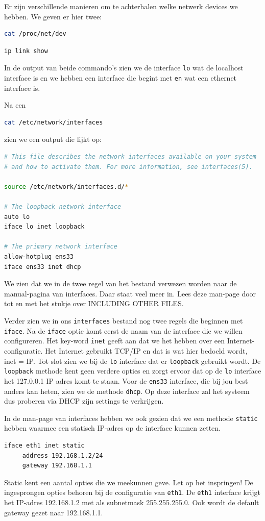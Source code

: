 Er zijn verschillende manieren om te achterhalen welke netwerk devices we hebben. We geven er hier twee:
\begin{lstlisting}[language=bash]
cat /proc/net/dev
\end{lstlisting}

\begin{lstlisting}[language=bash]
ip link show
\end{lstlisting}

In de output van beide commando's zien we de interface \texttt{lo} wat de localhost interface is en we hebben een interface die begint met \texttt{en} wat een ethernet interface is.

Na een
\begin{lstlisting}[language=bash]
cat /etc/network/interfaces
\end{lstlisting}
zien we een output die lijkt op:
\begin{lstlisting}[language=bash]
# This file describes the network interfaces available on your system
# and how to activate them. For more information, see interfaces(5).

source /etc/network/interfaces.d/*

# The loopback network interface
auto lo
iface lo inet loopback

# The primary network interface
allow-hotplug ens33
iface ens33 inet dhcp
\end{lstlisting}
We zien dat we in de twee regel van het bestand verwezen worden naar de manual-pagina van interfaces. Daar staat veel meer in. Lees deze man-page door tot en met het stukje over INCLUDING OTHER FILES.

Verder zien we in ons \texttt{interfaces} bestand nog twee regels die beginnen met \texttt{iface}. Na de \texttt{iface} optie komt eerst de naam van de interface die we willen configureren. Het key-word \texttt{inet} geeft aan dat we het hebben over een Internet-configuratie. Het Internet gebruikt TCP/IP en dat is wat hier bedoeld wordt, inet = IP. Tot slot zien we bij de \texttt{lo} interface dat er \texttt{loopback} gebruikt wordt. De \texttt{loopback} methode kent geen verdere opties en zorgt ervoor dat op de \texttt{lo} interface het 127.0.0.1 IP adres komt te staan. Voor de \texttt{ens33} interface, die bij jou best anders kan heten, zien we de methode \texttt{dhcp}. Op deze interface zal het systeem dus proberen via DHCP zijn settings te verkrijgen.

In de man-page van interfaces hebben we ook gezien dat we een methode \texttt{static} hebben waarmee een statisch IP-adres op de interface kunnen zetten.
\begin{lstlisting}[language=bash]
iface eth1 inet static
     address 192.168.1.2/24
     gateway 192.168.1.1
\end{lstlisting}
Static kent een aantal opties die we meekunnen geve. Let op het inspringen! De ingesprongen opties behoren bij de configuratie van \texttt{eth1}. De \texttt{eth1} interface krijgt het IP-adres 192.168.1.2 met als subnetmask 255.255.255.0. Ook wordt de default gateway gezet naar 192.168.1.1.

